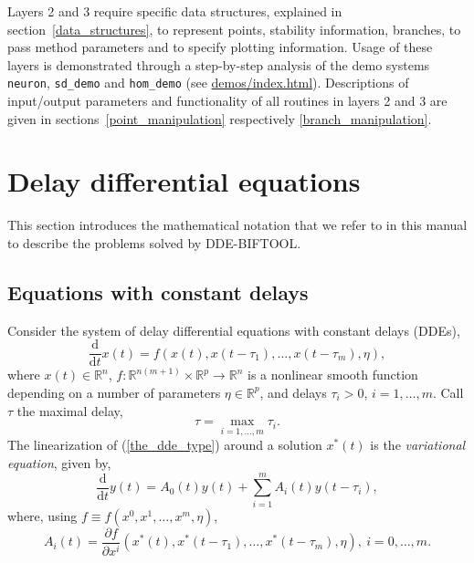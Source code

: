 \documentclass[10pt]{scrartcl}
\newcommand{\DDEBIFCODE}{\textsc{DDE-BIFTOOL}}
\newcommand{\define}[1]{\emph{#1}}
\newcommand{\demobase}{\url{demos/index.html}}
\renewcommand{\d}{\mathrm{d}}
\newcommand{\RR}{\mathbb{R}}
\begin{document}
Layers 2 and 3 require specific data structures, explained in
section~\ref{data_structures}, to represent points, stability
information, branches, to pass method parameters and to specify
plotting information.  Usage of these layers is
demonstrated %
through a step-by-step analysis of the demo systems \texttt{neuron},
\texttt{sd\_demo} and \texttt{hom\_demo} (see
\demobase{}).  Descriptions of input/output parameters and
functionality of all routines in layers 2 and 3 are given in
sections~\ref{point_manipulation} respectively
\ref{branch_manipulation}.

\section{Delay differential equations}\label{explain_dde}
\label{sec:ddes}
This section introduces the mathematical notation that we refer to in
this manual to describe the problems solved by \DDEBIFCODE{}.
\subsection{Equations with constant delays}\label{dde}

Consider the system of delay differential equations with constant
delays (DDEs),
\begin{equation}\label{the_dde_type}
\frac{\d}{\d t}{x(t)}=f(x(t),x(t-\tau_1),\ldots,x(t-\tau_m),\eta),
\end{equation}
where $x(t)\in\RR^n$, $f:\RR^{n(m+1)}\times\RR^p
\rightarrow\RR^n$ is a nonlinear smooth function
depending on a number of parameters $\eta\in\RR^p$, and delays
$\tau_i>0$, $i=1,\ldots,m$.
Call $\tau$ the maximal delay,
\[
\tau=\max_{i=1,\ldots,m}\tau_i.
\]
The linearization of (\ref{the_dde_type}) around a solution $x^*(t)$ 
is the \define{variational equation}, given by,
\begin{equation}\label{the_var_equa}
\frac{\d}{\d t}{y(t)}=A_0(t)y(t)+\sum_{i=1}^m A_i(t)y(t-\tau_i),
\end{equation}
where, using $f\equiv f(x^0,x^1,\ldots,x^m,\eta)$,  
\begin{equation}\label{A_def}
A_i(t)=\frac{\partial f}{\partial x^i}(x^*(t),x^*(t-\tau_1),\ldots,x^*(t-\tau_m),\eta), 
\ i=0,\ldots,m. 
\end{equation}
\end{document}
